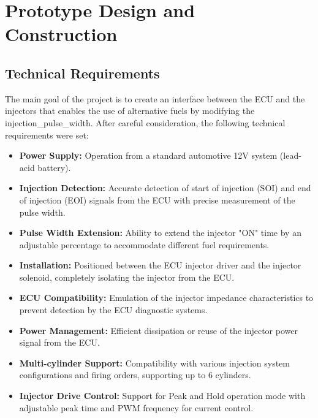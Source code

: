 \chapter{Prototype Design and Construction}

    \section{Technical Requirements}

        The main goal of the project is to create an interface between the ECU and the injectors that enables the use of alternative fuels by modifying the \gls{injection_pulse_width}. After careful consideration, the following technical requirements were set:

        \begin{itemize}
            \item \textbf{Power Supply:} Operation from a standard automotive 12V system (lead-acid battery).

            \item \textbf{Injection Detection:} Accurate detection of start of injection (SOI) and end of injection (EOI) signals from the ECU with precise measurement of the pulse width.

            \item \textbf{Pulse Width Extension:} Ability to extend the injector "ON" time by an adjustable percentage to accommodate different fuel requirements.

            \item \textbf{Installation:} Positioned between the ECU injector driver and the injector solenoid, completely isolating the injector from the ECU.

            \item \textbf{ECU Compatibility:} Emulation of the injector impedance characteristics to prevent detection by the ECU diagnostic systems.

            \item \textbf{Power Management:} Efficient dissipation or reuse of the injector power signal from the ECU.

            \item \textbf{Multi-cylinder Support:} Compatibility with various injection system configurations and firing orders, supporting up to 6 cylinders.

            \item \textbf{Injector Drive Control:} Support for Peak and Hold operation mode with adjustable peak time and PWM frequency for current control.
        \end{itemize}

